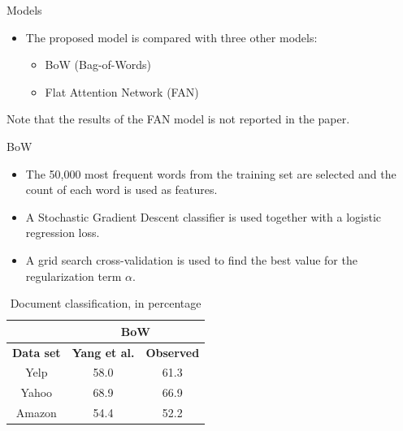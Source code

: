\documentclass[10pt]{beamer}
\begin{document}
\begin{frame}{Models}

\begin{itemize}
\item
The proposed model is compared with three other models:
\begin{itemize}
\item BoW (Bag-of-Words)
\item Flat Attention Network (FAN)
\end{itemize}
\end{itemize}

Note that the results of the FAN model is not reported in the paper.

\end{frame}


\begin{frame}{BoW}
\small{
\begin{itemize}
\item
The 50,000 most frequent words from the training set are selected and the count of each word is used as features.
\item
A Stochastic Gradient Descent classifier is used together with a logistic regression loss.
\item
A grid search cross-validation is used to find the best value for the regularization term $\alpha$.
\end{itemize}

\begin{table}[]
\begin{tabular}{c|c|c|}
\cline{2-3}
                       & \multicolumn{2}{c|}{\textbf{BoW}} \\
\hline
\multicolumn{1}{|c|}{\textbf{Data set}} & \textbf{Yang et al. \cite{yang2016hierarchical}} &  \textbf{Observed} \\
\hline
\multicolumn{1}{|c|}{Yelp} & 58.0 & 61.3 \\
\hline
\multicolumn{1}{|c|}{Yahoo} & 68.9 & 66.9 \\
\hline
\multicolumn{1}{|c|}{Amazon} & 54.4 & 52.2 \\
\hline
\end{tabular}
\caption{\small{Document classification, in percentage}}
\end{table}
}
\end{frame}
\end{document}
